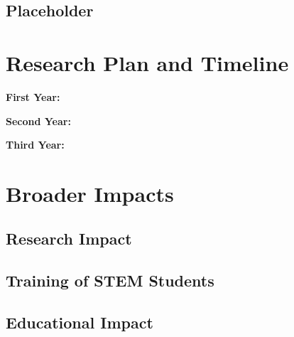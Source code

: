 \documentclass[11pt]{article}
\begin{document}
\subsection{Placeholder}


\section{Research Plan and Timeline}


\noindent\textbf{First Year:}  

\noindent\textbf{Second Year:}  

\noindent\textbf{Third Year:}  
\section{Broader Impacts}

\subsection{Research Impact}


\subsection{Training of STEM Students}

\subsection{Educational Impact}    


\newpage
\end{document}
